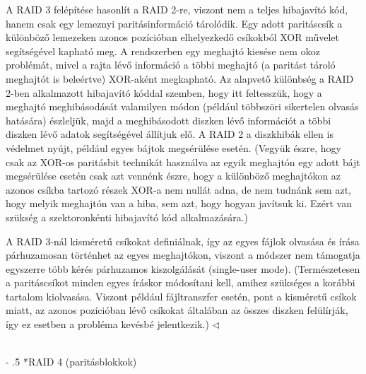 \documentclass[tikz,12pt,margin=0px]{article}
\makeatletter
\renewcommand\paragraph{%
	\@startsection{paragraph}{4}{0mm}%
	{-\baselineskip}%
	{.5\baselineskip}%
	{\normalfont\normalsize\bfseries}}
\makeatother
\begin{document}
    {\footnotesize \noindent {\color{blue} \faLightbulbO\ $\triangleright$ } }
    {\footnotesize
    \noindent A RAID 3 felépítése hasonlít a RAID 2-re, viszont nem a teljes hibajavító kód, hanem csak egy lemeznyi paritásinformáció tárolódik. Egy adott paritáscsík a különböző lemezeken azonos pozícióban elhelyezkedő csíkokból XOR művelet segítségével kapható meg. A rendszerben egy meghajtó kiesése nem okoz problémát, mivel a rajta lévő információ a többi meghajtó (a paritást tároló meghajtót is beleértve) XOR-aként megkapható. Az alapvető különbség a RAID 2-ben alkalmazott hibajavító kóddal szemben, hogy itt feltesszük, hogy a meghajtó meghibásodását valamilyen módon (például többszöri sikertelen olvasás hatására) észleljük, majd a meghibásodott diszken lévő információt a többi diszken lévő adatok segítségével állítjuk elő. A RAID 2 a diszkhibák ellen is védelmet nyújt, például egyes bájtok megsérülése esetén. (Vegyük észre, hogy csak az XOR-os paritásbit technikát használva az egyik meghajtón egy adott bájt megsérülése esetén csak azt vennénk észre, hogy a különböző meghajtókon az azonos csíkba tartozó részek XOR-a nem nullát adna, de nem tudnánk sem azt, hogy melyik meghajtón van a hiba, sem azt, hogy hogyan javítsuk ki. Ezért van szükség a szektoronkénti hibajavító kód alkalmazására.)

    \noindent A RAID 3-nál kisméretű csíkokat definiálnak, így az egyes fájlok olvasása és írása párhuzamosan történhet az egyes meghajtókon, viszont a módszer nem támogatja egyszerre több kérés párhuzamos kiszolgálását (single-user mode). (Természetesen a paritáscsíkot minden egyes íráskor módosítani kell, amihez szükséges a korábbi tartalom kiolvasása. Viszont például fájltranszfer esetén, pont a kisméretű csíkok miatt, az azonos pozícióban lévő csíkokat általában az összes diszken felülírják, így ez esetben a probléma kevésbé jelentkezik.)
    $\triangleleft$ \faLightbulbO}\\

	\paragraph*{RAID 4 (paritásblokkok)}
\end{document}
